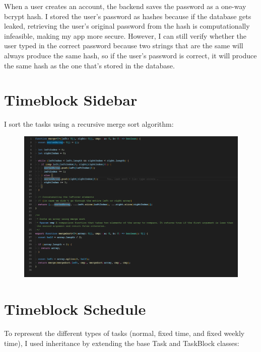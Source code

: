 \documentclass[notitlepage, 12pt]{report}
\begin{document}
When a user creates an account, the backend saves the password as a one-way bcrypt hash. I stored the user's password as hashes because if the database gets leaked, retrieving the user's original password from the hash is computationally infeasible, making my app more secure. However, I can still verify whether the user typed in the correct password because two strings that are the same will always produce the same hash, so if the user's password is correct, it will produce the same hash as the one that's stored in the database.

\section*{Timeblock Sidebar}

I sort the tasks using a recursive merge sort algorithm:

\begin{figure}[H]
	\includegraphics[width=1\textwidth]{merge-sort.png}
\end{figure}

\section*{Timeblock Schedule}

To represent the different types of tasks (normal, fixed time, and fixed weekly time), I used inheritance by extending the base Task and TaskBlock classes:
\end{document}
